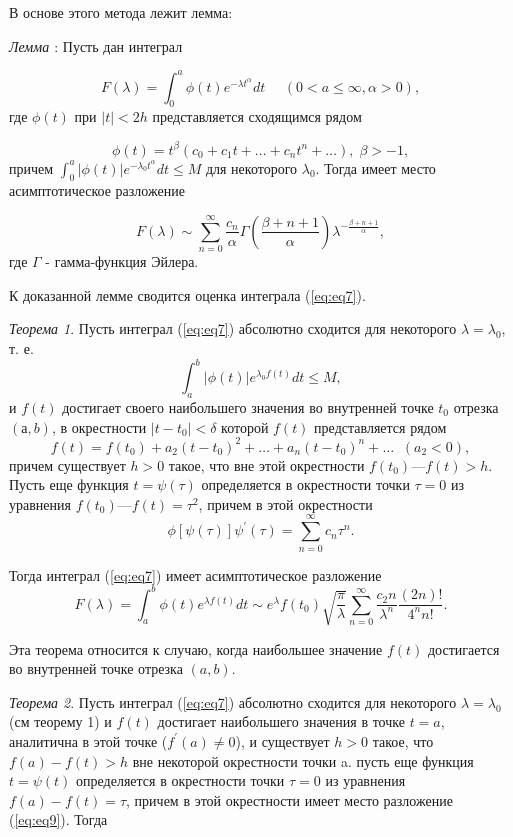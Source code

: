 \documentclass[%
bachelor,    %
natbib,      %
subf,        %
href,        %
colorlinks,  %
]{disser}
\begin{document}
В основе этого метода лежит лемма:

\textit{Лемма \label{lemma:lemma1}}: Пусть дан интеграл

$$
F(\lambda) = \int_{0}^{a}\phi(t)e^{-\lambda t^\alpha}dt \:\:\:\:\:\: (0 < a \le \infty, \alpha>0),
$$
где $\phi(t)$ при $|t|<2h$ представляется сходящимся рядом

$$
\phi(t)=t^\beta(c_0+c_1 t+\dots+c_n t^n+\dots), \; \beta>-1,
$$
причем $\int_{0}^{a}|\phi(t)| e^{-\lambda_0 t^\alpha}dt\le M$ для некоторого $\lambda_0$. Тогда имеет место асимптотическое разложение

\begin{equation}\label{eq:eq8}
F(\lambda) \sim \sum_{n=0}^{\infty}\frac{c_n}{\alpha} \Gamma\left(\frac{\beta + n + 1}{\alpha}\right)\lambda^{-\frac{\beta + n + 1}{\alpha}},
\end{equation} 
где $\Gamma$ - гамма-функция Эйлера.

К доказанной лемме сводится оценка интеграла (\ref{eq:eq7}).

\textit{Теорема 1\label{th:th1}}. Пусть интеграл (\ref{eq:eq7}) абсолютно сходится для некоторого $\lambda = \lambda_0$, т. е.
$$
\int_{a}^{b} |\phi(t)|e^{\lambda_0 f(t)}dt \le M,
$$
и $f(t)$ достигает своего наибольшего значения во внутренней точке $t_0$ отрезка $(а, b)$, в окрестности $| t - t_0| < \delta$ которой $f(t)$ представляется рядом
$$
f(t)=f(t_0) + a_2(t-t_0)^2+\dots+a_n(t-t_0)^n+\dots \;\; (a_2<0),
$$
причем существует $h > 0$ такое, что вне этой окрестности $f (t_0) — f(t) > h$. Пусть еще функция $t = \psi(\tau)$ определяется в окрестности точки $\tau = 0$ из уравнения $f(t_0) — f(t) = \tau^2$, причем в этой окрестности
\begin{equation}\label{eq:eq9}
\phi[\psi(\tau)]\psi^\prime(\tau) = \sum_{n=0}^{\infty} c_n\tau^n.
\end{equation}

Тогда интеграл (\ref{eq:eq7}) имеет асимптотическое разложение
$$
F(\lambda)=\int_{a}^{b}\phi(t)e^{\lambda f(t)}dt \sim e^\lambda f(t_0) \sqrt{\frac{\pi}{\lambda}} \sum_{n=0}^{\infty}\frac{c_2n}{\lambda^n}\frac{(2n)!}{4^n n!}.
$$

Эта теорема относится к случаю, когда наибольшее значение $f(t)$ достигается во внутренней точке отрезка $(a, b)$. 

\textit{Теорема 2\label{th:th2}}. Пусть интеграл (\ref{eq:eq7}) абсолютно сходится для некоторого $\lambda = \lambda_0$ (см теорему 1) и $f(t)$ достигает наибольшего значения в точке $t=a$, аналитична в этой точке ($f^\prime(a) \neq 0$), и существует $h>0$ такое, что $f(a)-f(t)>h$ вне некоторой окрестности точки a. пусть еще функция $t=\psi(t)$ определяется в окрестности точки $\tau=0$ из уравнения $f(a) - f(t) = \tau$, причем в этой окрестности имеет место разложение (\ref{eq:eq9}). Тогда
\end{document}

